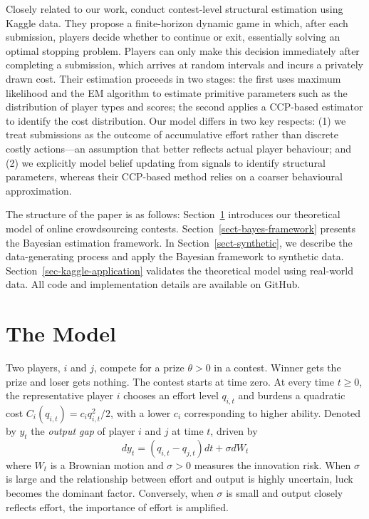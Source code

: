 \documentclass[mnsc]{informs3}
\begin{document}
Closely related to our work, \citet{lemus2021dynamic} conduct contest-level structural estimation using Kaggle data.
They propose a finite-horizon dynamic game in which, after each submission, players decide whether to continue or exit, essentially solving an optimal stopping problem.
Players can only make this decision immediately after completing a submission, which arrives at random intervals and incurs a privately drawn cost.
Their estimation proceeds in two stages: the first uses maximum likelihood and the EM algorithm to estimate primitive parameters such as the distribution of player types and scores; the second applies a CCP-based estimator to identify the cost distribution.
Our model differs in two key respects: 
(1) we treat submissions as the outcome of accumulative effort rather than discrete costly actions—an assumption that better reflects actual player behaviour; and
(2) we explicitly model belief updating from signals to identify structural parameters, whereas their CCP-based method relies on a coarser behavioural approximation.







The structure of the paper is as follows: 
Section~\ref{contest-theory} introduces our theoretical model of online crowdsourcing contests. 
Section~\ref{sect-bayes-framework} presents the Bayesian estimation framework. 
In Section~\ref{sect-synthetic}, we describe the data-generating process and apply the Bayesian framework to synthetic data. 
Section~\ref{sec-kaggle-application} validates the theoretical model using real-world data. 
All code and implementation details are available on GitHub.



\section{The Model}\label{contest-theory}

Two players, $i$ and $j$, compete for a prize $\theta>0$ in a contest. 
Winner gets the prize and loser gets nothing. 
The contest starts at time zero. 
At every time $t\ge0$, the representative player $i$ chooses an effort level $q_{i,t}$ and burdens a quadratic cost $C_i(q_{i,t}) = c_i q_{i,t}^2/2$, with a lower $c_i$ corresponding to higher ability. 
Denoted by $y_t$ the \textit{output gap} of player $i$ and $j$ at time $t$, driven by
\begin{equation}\label{eq-state-dynamics}
	dy_t = (q_{i,t}-q_{j,t})dt + \sigma dW_t
\end{equation}
where $W_t$ is a Brownian motion and $\sigma>0$ measures the innovation risk.
When $\sigma$ is large and the relationship between effort and output is highly uncertain, luck becomes the dominant factor. 
Conversely, when $\sigma$ is small and output closely reflects effort, the importance of effort is amplified.
\end{document}
